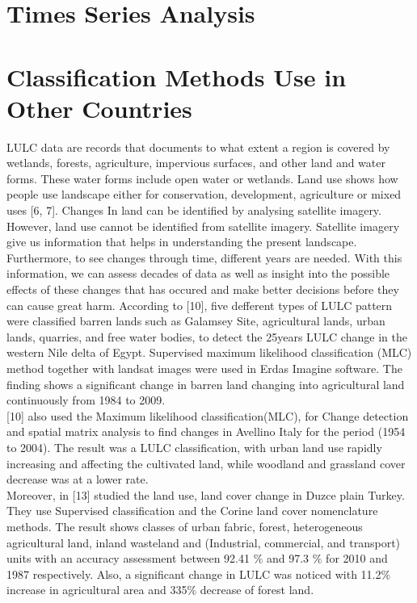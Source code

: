 \documentclass[12pt,a4paper]{article}
\author{Group 9}
\begin{document}
	\section{Times Series Analysis}
	
	\section{Classification Methods Use in Other Countries}
	LULC data are records that documents to what extent a region is covered by wetlands, forests, agriculture, impervious surfaces, and 	other land and water forms. These water forms include open water  or wetlands. Land use shows how people use landscape either for conservation, development, agriculture or mixed uses [6, 7]. Changes In land can be identified by analysing satellite imagery. However, land use cannot be identified from satellite imagery. Satellite imagery give us  information that helps in understanding the present landscape. Furthermore, to see changes	through time, different years are needed. With this information, we can assess  decades of data as well as  insight into the possible effects of these changes that has occured and make better decisions before they can cause great harm.	According to [10], five defferent types of LULC pattern were classified barren lands such as Galamsey Site, agricultural lands, urban lands, quarries, and free water bodies, to detect the 25years LULC change in the western Nile delta of Egypt. Supervised maximum likelihood classification (MLC)	method together with landsat images were used in Erdas Imagine software. The finding shows a significant
	change in barren land changing into agricultural land continuously	from 1984 to 2009.\\
	
	 [10] also used the Maximum likelihood classification(MLC), for  Change detection and spatial matrix analysis to find  changes in Avellino 	Italy for the period (1954 to 2004). The result was a LULC classification, with urban land use rapidly increasing and affecting the cultivated land, while woodland and grassland cover decrease was at a lower rate.\\
	
	
	Moreover, in [13] studied the land use, land cover change in Duzce plain Turkey. They use Supervised classification and the Corine land cover nomenclature methods. The result shows  classes of urban	fabric, forest, heterogeneous agricultural land, inland wasteland	and (Industrial, commercial, and transport) units with an accuracy	assessment between 92.41 $\%$ and 97.3 $\%$ for 2010 and
	1987 respectively. Also, a significant change in LULC was noticed with 11.2$\%$ increase in agricultural area and 335$\%$ decrease	of forest land.\\
	
\end{document}
